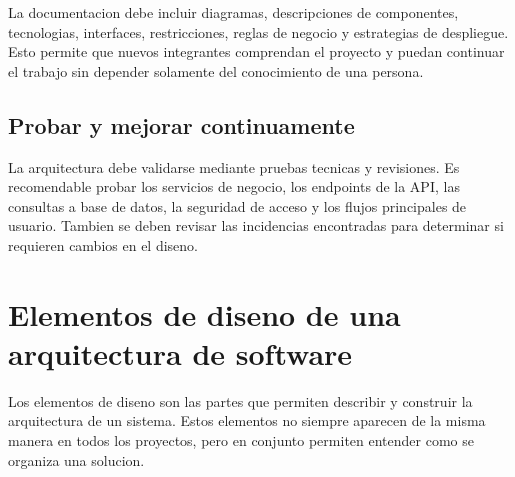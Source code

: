 \documentclass[12pt,letterpaper]{article}
\begin{document}
La documentacion debe incluir diagramas, descripciones de componentes, tecnologias, interfaces, restricciones, reglas de negocio y estrategias de despliegue. Esto permite que nuevos integrantes comprendan el proyecto y puedan continuar el trabajo sin depender solamente del conocimiento de una persona.

\subsection{Probar y mejorar continuamente}

La arquitectura debe validarse mediante pruebas tecnicas y revisiones. Es recomendable probar los servicios de negocio, los endpoints de la API, las consultas a base de datos, la seguridad de acceso y los flujos principales de usuario. Tambien se deben revisar las incidencias encontradas para determinar si requieren cambios en el diseno.

\section{Elementos de diseno de una arquitectura de software}

Los elementos de diseno son las partes que permiten describir y construir la arquitectura de un sistema. Estos elementos no siempre aparecen de la misma manera en todos los proyectos, pero en conjunto permiten entender como se organiza una solucion.
\end{document}
